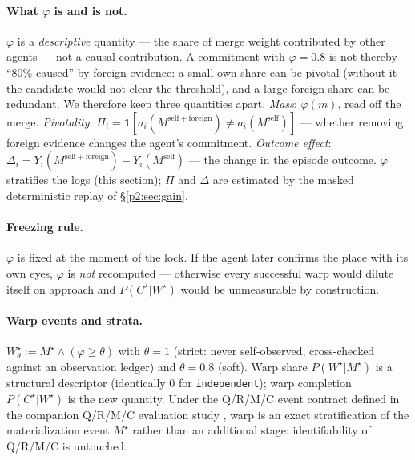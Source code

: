 \documentclass{article}
\newcommand{\method}[1]{\texttt{#1}}
\newcommand{\wstar}{W^{\star}}
\newcommand{\mstar}{M^{\star}}
\newcommand{\cstar}{C^{\star}}
\begin{document}
\paragraph{What $\varphi$ is and is not.} $\varphi$ is a
\emph{descriptive} quantity --- the share of merge weight contributed
by other agents --- not a causal contribution. A commitment with
$\varphi{=}0.8$ is not thereby ``80\% caused'' by foreign evidence: a
small own share can be pivotal (without it the candidate would not
clear the threshold), and a large foreign share can be redundant. We
therefore keep three quantities apart. \emph{Mass}: $\varphi(m)$, read
off the merge. \emph{Pivotality}: $\Pi_i = \mathbf{1}[a_i(M^{\mathrm{self+foreign}})
\neq a_i(M^{\mathrm{self}})]$ --- whether removing foreign evidence
changes the agent's commitment. \emph{Outcome effect}:
$\Delta_i = Y_i(M^{\mathrm{self+foreign}}) - Y_i(M^{\mathrm{self}})$
--- the change in the episode outcome. $\varphi$ stratifies the logs
(this section); $\Pi$ and $\Delta$ are estimated by the masked
deterministic replay of \S\ref{p2:sec:gain}.

\paragraph{Freezing rule.} $\varphi$ is fixed at the moment of the
lock. If the agent later confirms the place with its own eyes,
$\varphi$ is \emph{not} recomputed --- otherwise every successful warp
would dilute itself on approach and $P(\cstar|\wstar)$ would be
unmeasurable by construction.

\paragraph{Warp events and strata.} $\wstar_\theta := \mstar \wedge
(\varphi\ge\theta)$ with $\theta{=}1$ (strict: never self-observed,
cross-checked against an observation ledger) and $\theta{=}0.8$
(soft). Warp share $P(\wstar|\mstar)$ is a structural descriptor
(identically $0$ for \method{independent}); warp completion
$P(\cstar|\wstar)$ is the new quantity. Under the Q/R/M/C event
contract defined in the companion Q/R/M/C evaluation study \citep{songlines1}, warp is an exact
stratification of the materialization event $\mstar$ rather than an
additional stage: identifiability of Q/R/M/C is untouched.
\end{document}
